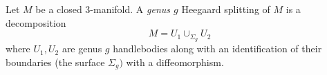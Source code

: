 

    Let $M$ be a closed 3-manifold. A \emph{genus $g$} Heegaard splitting of $M$ is a decomposition
    \[M=U_1\cup_{\Sigma_g} U_2\]
    where $U_1, U_2$ are genus $g$ handlebodies along with an identification of their boundaries (the surface $\Sigma_g)$ with a diffeomorphism.
